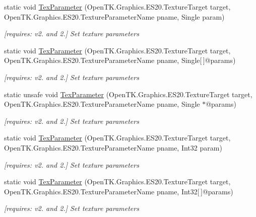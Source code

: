 \begin{DoxyCompactItemize}
static void \hyperlink{class_open_t_k_1_1_graphics_1_1_e_s20_1_1_g_l_ae235e0d293028da51d53546572dc2bdf}{Tex\-Parameter} (Open\-T\-K.\-Graphics.\-E\-S20.\-Texture\-Target target, Open\-T\-K.\-Graphics.\-E\-S20.\-Texture\-Parameter\-Name pname, Single param)
\begin{DoxyCompactList}\small\item\em \mbox{[}requires\-: v2. and 2.\mbox{]} Set texture parameters \end{DoxyCompactList}\item 
static void \hyperlink{class_open_t_k_1_1_graphics_1_1_e_s20_1_1_g_l_a4d430efb21335c71fd2258b3b892ad07}{Tex\-Parameter} (Open\-T\-K.\-Graphics.\-E\-S20.\-Texture\-Target target, Open\-T\-K.\-Graphics.\-E\-S20.\-Texture\-Parameter\-Name pname, Single\mbox{[}$\,$\mbox{]}@params)
\begin{DoxyCompactList}\small\item\em \mbox{[}requires\-: v2. and 2.\mbox{]} Set texture parameters \end{DoxyCompactList}\item 
static unsafe void \hyperlink{class_open_t_k_1_1_graphics_1_1_e_s20_1_1_g_l_a29de953cf17ab06b82e7684ceabd65e3}{Tex\-Parameter} (Open\-T\-K.\-Graphics.\-E\-S20.\-Texture\-Target target, Open\-T\-K.\-Graphics.\-E\-S20.\-Texture\-Parameter\-Name pname, Single $\ast$@params)
\begin{DoxyCompactList}\small\item\em \mbox{[}requires\-: v2. and 2.\mbox{]} Set texture parameters \end{DoxyCompactList}\item 
static void \hyperlink{class_open_t_k_1_1_graphics_1_1_e_s20_1_1_g_l_ac8b1d95792126b2b18a155bb6d7b6cb2}{Tex\-Parameter} (Open\-T\-K.\-Graphics.\-E\-S20.\-Texture\-Target target, Open\-T\-K.\-Graphics.\-E\-S20.\-Texture\-Parameter\-Name pname, Int32 param)
\begin{DoxyCompactList}\small\item\em \mbox{[}requires\-: v2. and 2.\mbox{]} Set texture parameters \end{DoxyCompactList}\item 
static void \hyperlink{class_open_t_k_1_1_graphics_1_1_e_s20_1_1_g_l_ab50b10a87b48acb6d906dcb7c5e2a05c}{Tex\-Parameter} (Open\-T\-K.\-Graphics.\-E\-S20.\-Texture\-Target target, Open\-T\-K.\-Graphics.\-E\-S20.\-Texture\-Parameter\-Name pname, Int32\mbox{[}$\,$\mbox{]}@params)
\begin{DoxyCompactList}\small\item\em \mbox{[}requires\-: v2. and 2.\mbox{]} Set texture parameters \end{DoxyCompactList}\item 

\end{DoxyCompactItemize}
